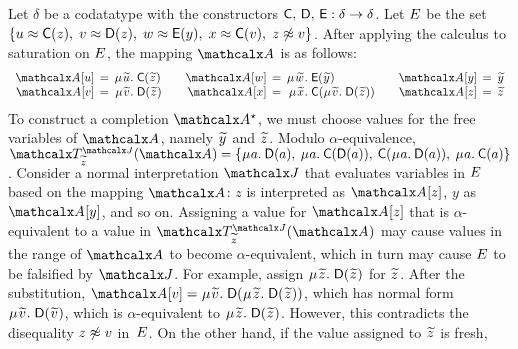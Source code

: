 \begin{examplex}
Let $\delta$ be a codatatype with the constructors $\textsf{C},\, \textsf{D},\, \textsf{E} :\delta \rightarrow \delta$.
Let $E$ be the set
$\{
u \approx \textsf{C}( z ),\;
v \approx \textsf{D}( z ),\;
w \approx \textsf{E}( y ),\;
x \approx \textsf{C}( v ),\;
z \not\approx v
\}$.
After applying the calculus to saturation on $E$, the mapping $\Val$ is as follows:
\[\begin{array}{r@{}c@{}r@{}l@{\qquad}r@{}c@{}r@{}l@{\qquad}r@{}c@{}l}
\Val \ec{u} & {}\,=\,{} & \MU {\Varec{u}}.\; & \const{C}( {\Varec{z}} ) &
\Val \ec{w} & = & \MU {\Varec{w}}.\; & \const{E}( {\Varec{y}} ) &
\Val \ec{y} & {}\,=\,{} & {\Varec{y}} \\
\Val \ec{v} & = & \MU {\Varec{v}}.\; & \const{D}( {\Varec{z}} ) &
\Val \ec{x} & {}\,=\,{} & \MU {\Varec{x}}.\; & \const{C}( \MU {\Varec{v}}.\; \const{D}( {\Varec{z}} ) ) &
\Val \ec{z} & = & {\Varec{z}}
\end{array}\]
%
To construct a completion $\ValC$, we must choose values for the free
variables of $\Val$, namely ${\Varec{y}}$ and ${\Varec{z}}$.
Modulo $\alpha$-equivalence, $\smash{\Terms^{\smash{\J}}_{{\Varec{z}}}( \Val )} =
\{
\MU a.\: \const{D}( a ),\:
\MU a.\: \const{C}( \const{D}( a )),\allowbreak\:
\const{C}( \MU a.\: \const{D}( a )),\allowbreak\:
\MU a.\: \const{C}( a )
\}
$.
Consider a normal interpretation $\J$ that evaluates variables in $E$ based on the mapping $\Val$:
$z$ is interpreted as $\Val \ec{z}$, $y$ as $\Val \ec{y}$, and so on.
Assigning a value for $\Val \ec{z}$ that is $\alpha$-equivalent to a value in $\Terms^{\smash{\J}}_{{\Varec{z}}}( \Val )$
may cause values in the range of $\Val$ to become $\alpha$-equivalent,
which in turn may cause $E$ to be falsified by $\J$.
For example, assign $\MU {\Varec{z}}.\; \const{D}( {\Varec{z}} )$ for ${\Varec{z}}$.
After the substitution, $\Val \ec{v} = \MU {\Varec{v}}.\; \const{D}( \MU {\Varec{z}}.\; \const{D}( {\Varec{z}} ) )$,
which has normal form $\MU {\Varec{v}}.\; \const{D}( {\Varec{v}} )$,
which is $\alpha$-equivalent to $\MU {\Varec{z}}.\; \const{D}( {\Varec{z}} )$.
However, this contradicts the disequality $z \not\approx v$ in~$E$.
On the other hand, if the value assigned to ${\Varec{z}}$ is fresh, %

\end{examplex}
